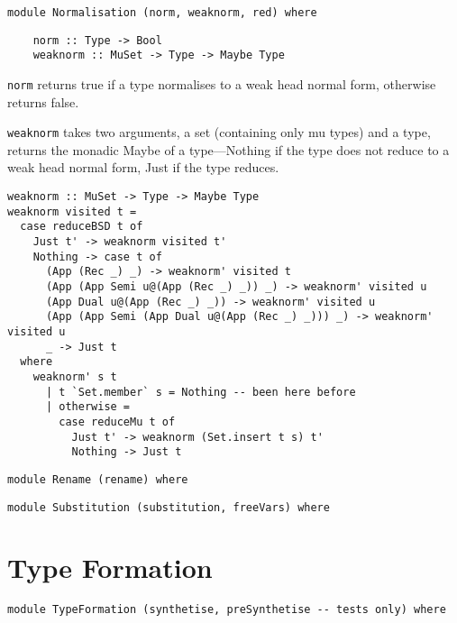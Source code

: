 \begin{lstlisting}
module Normalisation (norm, weaknorm, red) where
\end{lstlisting}

\begin{lstlisting}
    norm :: Type -> Bool
    weaknorm :: MuSet -> Type -> Maybe Type
\end{lstlisting}

\lstinline{norm} returns true if a type normalises to a weak head normal form, otherwise returns false.

\lstinline{weaknorm} takes two arguments, a set (containing only mu types) and a type, returns the monadic Maybe of a type---Nothing if the type does not reduce to a weak head normal form, Just if the type reduces.

\begin{lstlisting}
weaknorm :: MuSet -> Type -> Maybe Type
weaknorm visited t = 
  case reduceBSD t of
    Just t' -> weaknorm visited t'
    Nothing -> case t of
      (App (Rec _) _) -> weaknorm' visited t
      (App (App Semi u@(App (Rec _) _)) _) -> weaknorm' visited u
      (App Dual u@(App (Rec _) _)) -> weaknorm' visited u
      (App (App Semi (App Dual u@(App (Rec _) _))) _) -> weaknorm' visited u
      _ -> Just t
  where
    weaknorm' s t
      | t `Set.member` s = Nothing -- been here before
      | otherwise = 
        case reduceMu t of
          Just t' -> weaknorm (Set.insert t s) t'
          Nothing -> Just t
\end{lstlisting}

\begin{lstlisting}
module Rename (rename) where
\end{lstlisting}

\begin{lstlisting}
module Substitution (substitution, freeVars) where

\end{lstlisting}
\section{Type Formation}


\begin{lstlisting}
module TypeFormation (synthetise, preSynthetise -- tests only) where

\end{lstlisting}

